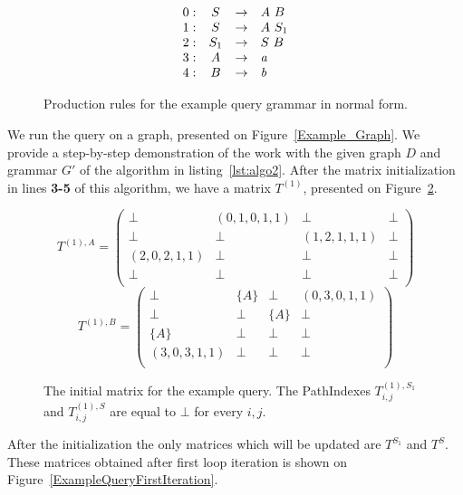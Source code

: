 \begin{figure}[h]
	\[
	\begin{array}{rccl}
	0: & S & \rightarrow & A \ B \\
	1: & S & \rightarrow & A \ S_1 \\
	2: & S_1 & \rightarrow & S \ B \\
	3: & A & \rightarrow & \text{\emph{a}} \\ 
	4: & B & \rightarrow & \text{\emph{b}} \\ 
	\end{array}
	\]
	\caption{Production rules for the example query grammar in normal form.}
	\label{ProductionRulesExampleQueryCNF}
\end{figure}

We run the query on a graph, presented on Figure~\ref{Example_Graph}. We provide a step-by-step demonstration of the work with the given graph $D$ and grammar $G'$ of the algorithm in listing~\ref{lst:algo2}. After the matrix initialization in lines \textbf{3-5} of this algorithm, we have a matrix $T^{(1)}$, presented on Figure~\ref{ExampleQueryInitMatrix}.

\begin{figure}[h]
	\[
	T^{(1),A} = \begin{pmatrix}
	\bot & (0,1,0,1,1)       & \bot & \bot       \\
	\bot & \bot & (1,2,1,1,1)       & \bot \\
	(2,0,2,1,1)       & \bot & \bot & \bot \\
	\bot       & \bot & \bot & \bot \\
	\end{pmatrix}
	\]
	\[
	T^{(1),B} = \begin{pmatrix}
	\bot & \{A\}       & \bot & (0,3,0,1,1)       \\
	\bot & \bot & \{A\}       & \bot \\
	\{A\}       & \bot & \bot & \bot \\
	(3,0,3,1,1)      & \bot & \bot & \bot \\
	\end{pmatrix}
	\]
	\caption{The initial matrix for the example query. The PathIndexes $T^{(1),S_1}_{i,j}$ and $T^{(1),S}_{i,j}$ are equal to $\bot$ for every $i,j$.}
	\label{ExampleQueryInitMatrix}
\end{figure}

After the initialization the only matrices which will be updated are $T^{S_1}$ and $T^{S}$. These matrices obtained after first loop iteration is shown on Figure~\ref{ExampleQueryFirstIteration}.

